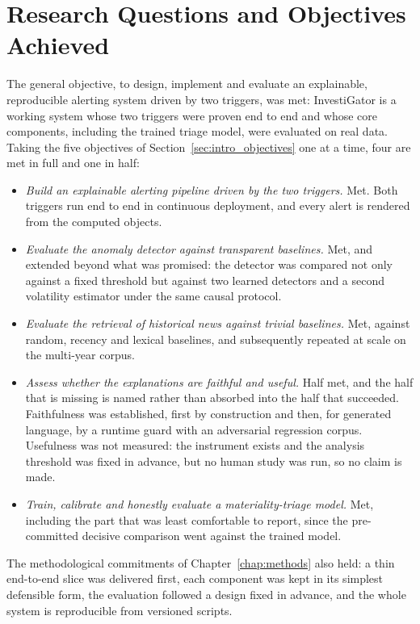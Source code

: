 \section{Research Questions and Objectives Achieved}
\label{sec:concl_objectives}

The general objective, to design, implement and evaluate an explainable, reproducible alerting system
driven by two triggers, was met: InvestiGator is a working system whose two triggers were proven end to
end and whose core components, including the trained triage model, were evaluated on real data. Taking
the five objectives of Section~\ref{sec:intro_objectives} one at a time, four are met in full and one
in half:

\begin{itemize}
  \item \emph{Build an explainable alerting pipeline driven by the two triggers.} Met. Both triggers
        run end to end in continuous deployment, and every alert is rendered from the computed objects.
  \item \emph{Evaluate the anomaly detector against transparent baselines.} Met, and extended beyond
        what was promised: the detector was compared not only against a fixed threshold but against two
        learned detectors and a second volatility estimator under the same causal protocol.
  \item \emph{Evaluate the retrieval of historical news against trivial baselines.} Met, against
        random, recency and lexical baselines, and subsequently repeated at scale on the multi-year
        corpus.
  \item \emph{Assess whether the explanations are faithful and useful.} Half met, and the half that is
        missing is named rather than absorbed into the half that succeeded. Faithfulness was
        established, first by construction and then, for generated language, by a runtime guard with an
        adversarial regression corpus. Usefulness was not measured: the instrument exists and the
        analysis threshold was fixed in advance, but no human study was run, so no claim is made.
  \item \emph{Train, calibrate and honestly evaluate a materiality-triage model.} Met, including the
        part that was least comfortable to report, since the pre-committed decisive comparison went
        against the trained model.
\end{itemize}

The methodological commitments of Chapter~\ref{chap:methods} also held: a thin end-to-end slice was
delivered first, each component was kept in its simplest defensible form, the evaluation followed a
design fixed in advance, and the whole system is reproducible from versioned scripts.


